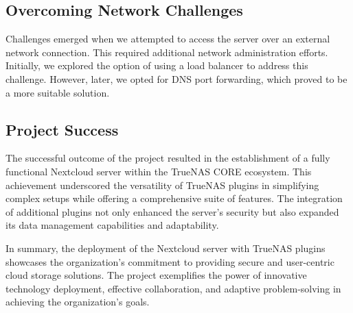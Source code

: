 \subsection{Overcoming Network Challenges}

Challenges emerged when we attempted to access the server over an external network connection. This required additional network administration efforts. Initially, we explored the option of using a load balancer to address this challenge. However, later, we opted for DNS port forwarding, which proved to be a more suitable solution.

\subsection{Project Success}

The successful outcome of the project resulted in the establishment of a fully functional Nextcloud server within the TrueNAS CORE ecosystem. This achievement underscored the versatility of TrueNAS plugins in simplifying complex setups while offering a comprehensive suite of features. The integration of additional plugins not only enhanced the server's security but also expanded its data management capabilities and adaptability.

In summary, the deployment of the Nextcloud server with TrueNAS plugins showcases the organization's commitment to providing secure and user-centric cloud storage solutions. The project exemplifies the power of innovative technology deployment, effective collaboration, and adaptive problem-solving in achieving the organization's goals.
